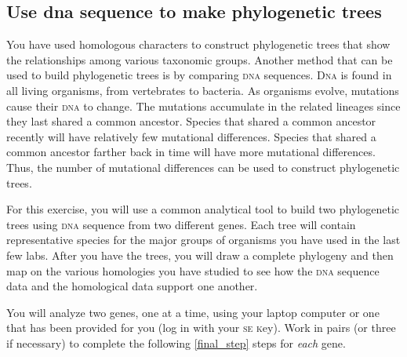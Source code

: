 \documentclass[12pt, hidelinks]{exam}
\newcommand{\dna}{\textsc{dna}}
\begin{document}
\subsection*{Use dna sequence to make phylogenetic trees}

You have used homologous characters to construct phylogenetic trees that 
show the relationships among various taxonomic groups. Another method
that can be used to build phylogenetic trees is by comparing \dna{} sequences.
D\textsc{na} is found in all living organisms, from vertebrates to bacteria. As 
organisms evolve, mutations cause their \dna{} to change. The mutations
accumulate in the related lineages since they last shared a common ancestor.
Species that shared a common ancestor recently will have relatively few mutational
differences. Species that shared a common ancestor farther back in time will
have more mutational differences. Thus, the number of mutational differences
can be used to construct phylogenetic trees.


For this exercise, you will use a common analytical tool to build two phylogenetic trees using \dna{} sequence
from two different genes. Each tree will contain representative species for the major groups of organisms you have
used in the last few labs. After you have the trees, you will draw a complete phylogeny and then map on the
various homologies you have studied to see how the \dna{} sequence data and the homological data support one another.

You will analyze two genes, one at a time, using your laptop computer or one that has been provided for you (log in with your \textsc{se k}ey).   Work in pairs (or three if necessary) to complete the following \ref{final_step} steps for \emph{each} gene.
\end{document}
